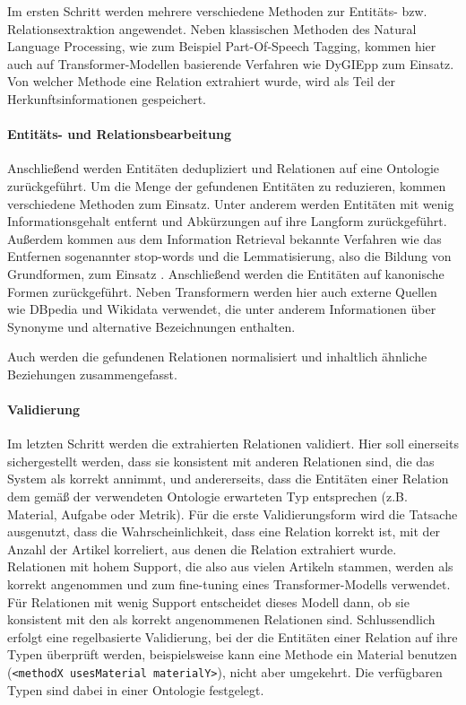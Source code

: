 Im ersten Schritt werden mehrere verschiedene Methoden zur Entitäts- bzw. Relationsextraktion angewendet.
Neben klassischen Methoden des Natural Language Processing, wie zum Beispiel Part-Of-Speech Tagging, kommen hier auch auf Transformer-Modellen basierende Verfahren wie DyGIEpp \cite{wadden-etal-2019-entity} zum Einsatz.
Von welcher Methode eine Relation extrahiert wurde, wird als Teil der Herkunftsinformationen gespeichert.

\paragraph{Entitäts- und Relationsbearbeitung}

Anschließend werden Entitäten dedupliziert und Relationen auf eine Ontologie zurückgeführt.
Um die Menge der gefundenen Entitäten zu reduzieren, kommen verschiedene Methoden zum Einsatz.
Unter anderem werden Entitäten mit wenig Informationsgehalt entfernt und Abkürzungen auf ihre Langform zurückgeführt.
Außerdem kommen aus dem Information Retrieval bekannte Verfahren wie das Entfernen sogenannter stop-words und die Lemmatisierung, also die Bildung von Grundformen, zum Einsatz \cite{Ceri2013}.
Anschließend werden die Entitäten auf kanonische Formen zurückgeführt.
Neben Transformern werden hier auch externe Quellen wie DBpedia und Wikidata verwendet, die unter anderem Informationen über Synonyme und alternative Bezeichnungen enthalten.

Auch werden die gefundenen Relationen normalisiert und inhaltlich ähnliche Beziehungen zusammengefasst.

\paragraph{Validierung}

Im letzten Schritt werden die extrahierten Relationen validiert.
Hier soll einerseits sichergestellt werden, dass sie konsistent mit anderen Relationen sind, die das System als korrekt annimmt, und andererseits, dass die Entitäten einer Relation dem \textemdash gemäß der verwendeten Ontologie \textemdash erwarteten Typ entsprechen (z.B. Material, Aufgabe oder Metrik).
Für die erste Validierungsform wird die Tatsache ausgenutzt, dass die Wahrscheinlichkeit, dass eine Relation korrekt ist, mit der Anzahl der Artikel korreliert, aus denen die Relation extrahiert wurde.
Relationen mit hohem Support, die also aus vielen Artikeln stammen, werden als korrekt angenommen und zum fine-tuning eines Transformer-Modells verwendet.
Für Relationen mit wenig Support entscheidet dieses Modell dann, ob sie konsistent mit den als korrekt angenommenen Relationen sind.
Schlussendlich erfolgt eine regelbasierte Validierung, bei der die Entitäten einer Relation auf ihre Typen überprüft werden, beispielsweise kann eine Methode ein Material benutzen (\verb|<methodX usesMaterial materialY>|), nicht aber umgekehrt.
Die verfügbaren Typen sind dabei in einer Ontologie festgelegt.

